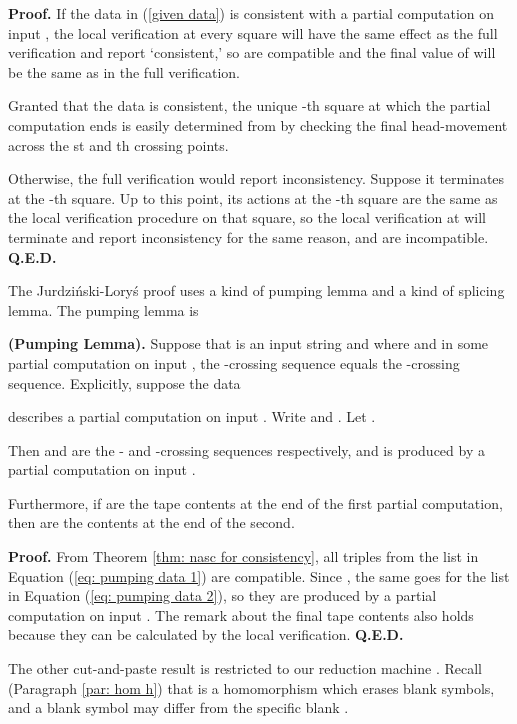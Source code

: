 {\bf Proof.}
If the data in (\ref{given data}) is consistent
with a partial computation on input ,  the local
verification at every square will have the same effect as
the full verification and report `consistent,'
so  are compatible
and the final value of  will be the same as
in the full verification.

Granted that the data is consistent, the
unique -th square at which the partial computation
ends is easily determined from 
by checking the final head-movement across
the st and th crossing points.

Otherwise, the full verification would
report inconsistency.  Suppose it terminates
at the -th square.
Up to this point, its actions at the -th square
are the same as the local verification procedure on that square, so the local
verification at  will terminate and report inconsistency for
the same reason, and  are incompatible.
{\bf Q.E.D.}\medskip


The Jurdzi\'nski-Lory\'s proof uses a kind of pumping lemma
and a kind of splicing lemma.  The pumping lemma is

\begin{corollary}
\label{cor: pumping}
{\bf (Pumping Lemma).}
Suppose that  is an input string and 
where  and in some partial
computation on input , the -crossing
sequence equals the -crossing sequence.
Explicitly, suppose the data

describes a
partial computation on input . Write
 and .
Let .

Then   and  are the - and -crossing
sequences respectively, and
 is
produced by a partial computation on input .

Furthermore, if  are the tape contents
at the end of the first partial computation, then
 are the
contents at the end of the second.
\end{corollary}

{\bf Proof.}  From Theorem \ref{thm: nasc for consistency},
all triples  from the list in Equation
(\ref{eq: pumping data 1}) are compatible.  Since
, the same goes for the list in Equation
(\ref{eq: pumping data 2}), so they are produced by
a partial computation on input .  The remark about
the final tape contents also holds because they
can be calculated by the local verification. {\bf Q.E.D.}\medskip

The other cut-and-paste result is restricted to
our reduction machine .
Recall
(Paragraph \ref{par: hom h})
that  is a homomorphism which erases blank symbols,
and a blank symbol may differ from the specific
blank .

